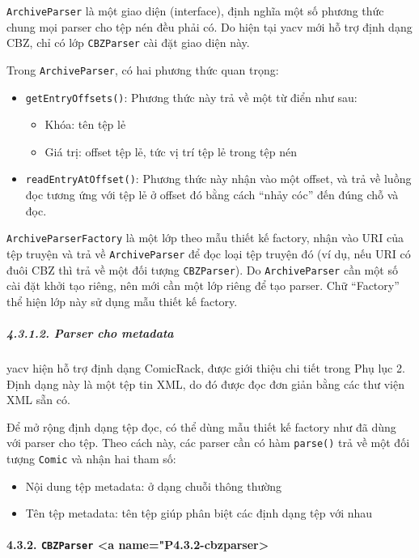 \documentclass[
]{article}
\begin{document}
\texttt{ArchiveParser} là một giao diện (interface), định nghĩa một số
phương thức chung mọi parser cho tệp nén đều phải có. Do hiện tại yacv
mới hỗ trợ định dạng CBZ, chỉ có lớp \texttt{CBZParser} cài đặt giao
diện này.

Trong \texttt{ArchiveParser}, có hai phương thức quan trọng:

\begin{itemize}
\item
  \texttt{getEntryOffsets()}: Phương thức này trả về một từ điển như
  sau:

  \begin{itemize}
    \item
    Khóa: tên tệp lẻ
  \item
    Giá trị: offset tệp lẻ, tức vị trí tệp lẻ trong tệp nén
  \end{itemize}
\item
  \texttt{readEntryAtOffset()}: Phương thức này nhận vào một offset, và
  trả về luồng đọc tương ứng với tệp lẻ ở offset đó bằng cách ``nhảy
  cóc'' đến đúng chỗ và đọc.
\end{itemize}

\texttt{ArchiveParserFactory} là một lớp theo mẫu thiết kế factory, nhận
vào URI của tệp truyện và trả về \texttt{ArchiveParser} để đọc loại tệp
truyện đó (ví dụ, nếu URI có đuôi CBZ thì trả về một đối tượng
\texttt{CBZParser}). Do \texttt{ArchiveParser} cần một số cài đặt khởi
tạo riêng, nên mới cần một lớp riêng để tạo parser. Chữ ``Factory'' thể
hiện lớp này sử dụng mẫu thiết kế factory.

\hypertarget{parser-cho-metadata}{%
\subparagraph{4.3.1.2. Parser cho metadata}\label{parser-cho-metadata}}

yacv hiện hỗ trợ định dạng ComicRack, được giới thiệu chi tiết trong Phụ
lục 2. Định dạng này là một tệp tin XML, do đó được đọc đơn giản bằng
các thư viện XML sẵn có.

Để mở rộng định dạng tệp đọc, có thể dùng mẫu thiết kế factory như đã
dùng với parser cho tệp. Theo cách này, các parser cần có hàm
\texttt{parse()} trả về một đối tượng \texttt{Comic} và nhận hai tham
số:

\begin{itemize}
\item
  Nội dung tệp metadata: ở dạng chuỗi thông thường
\item
  Tên tệp metadata: tên tệp giúp phân biệt các định dạng tệp với nhau
\end{itemize}

\hypertarget{cbzparser-a-namep4.3.2-cbzparser}{%
\paragraph{\texorpdfstring{4.3.2. \texttt{CBZParser} \textless a
name="P4.3.2-cbzparser>}{4.3.2. CBZParser \textless a name="P4.3.2-cbzparser>}}\label{cbzparser-a-namep4.3.2-cbzparser}}
\end{document}

